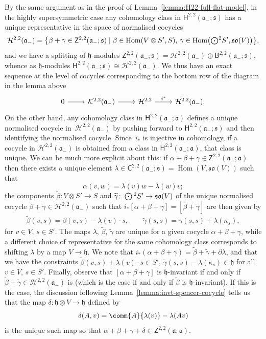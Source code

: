 \documentclass[10pt,a4paper]{amsart}
\numberwithin{equation}{section}
\newcommand{\fa}{\mathfrak{a}}
\newcommand{\fh}{\mathfrak{h}}
\newcommand{\fs}{\mathfrak{s}}
\newcommand{\fso}{\mathfrak{so}}
\newcommand{\cH}{\mathcal{H}}
\newcommand{\cK}{\mathcal{K}}
\newcommand{\ssB}{\mathsf{B}}
\newcommand{\ssC}{\mathsf{C}}
\newcommand{\ssH}{\mathsf{H}}
\newcommand{\ssZ}{\mathsf{Z}}
\newcommand{\betatilde}{\widetilde{\beta}}
\newcommand{\gammatilde}{\widetilde{\gamma}}
\newcommand{\Odot}{\mathchoice{{\textstyle\bigodot}}{\bigodot}{\bigodot}{\bigodot}}
\newcommand{\1}{\mathbbm{1}}
\DeclareMathOperator{\Hom}{Hom}
\begin{document}
By the same argument as in the proof of Lemma~\ref{lemma:H22-full-flat-model}, in the highly supersymmetric case any cohomology class in $\ssH^{2,2}(\fa_-;\fs)$ has a unique representative in the space of normalised cocycles
\[%
	\cH^{2,2}(\fa_-)
	= \bigl\{\beta+\gamma \in \ssZ^{2,2}(\fa_-;\fs)
		\mid
			\beta\in\Hom(V\otimes S',S),\,
			\gamma\in\Hom\bigl(\Odot^2S',\fso(V)\bigr)\bigr\},
\]
and we have a splitting of $\fh$-modules $\ssZ^{2,2}(\fa_-;\fs)=\cH^{2,2}(\fa_-)\oplus\ssB^{2,2}(\fa_-;\fs)$, whence as $\fh$-modules $\ssH^{2,2}(\fa_-;\fs) \cong \cH^{2,2}(\fa_-)$. We thus have an exact sequence at the level of cocycles corresponding to the bottom row of the diagram in the lemma above
\[
\begin{tikzcd}
	0 \arrow[r]
	& \cK^{2,2}(\fa_-) \arrow[r]
	& \cH^{2,2} \arrow[r, "i^*"]
	& \cH^{2,2}(\fa_-).
\end{tikzcd}
\]
On the other hand, any cohomology class in $\ssH^{2,2}(\fa_-;\fa)$ defines a unique normalised cocycle in~$\cH^{2,2}(\fa_-)$ by pushing forward to $\ssH^{2,2}(\fa_-;\fs)$ and then identifying the normalised cocycle. Since~$i_*$ is injective in cohomology, if a cocycle in $\cH^{2,2}(\fa_-)$ is obtained from a class in $\ssH^{2,2}(\fa_-;\fa)$, that class is unique. We can be much more explicit about this: if $\alpha+\beta+\gamma\in\ssZ^{2,2}(\fa_-;\fa)$ then there exists a unique element $\lambda\in\ssC^{2,2}(\fa_-;\fs)=\Hom(V,\fso(V))$ such that
\begin{equation}\label{eq:alpha-lambda}
	\alpha(v,w) = \lambda(v)w - \lambda(w)v;
\end{equation}
the components $\betatilde\colon V\otimes S' \to S$ and $\gammatilde\colon \Odot^2 S' \to \fso(V)$ of the unique normalised cocycle $\betatilde+\gammatilde\in\cH^{2,2}(\fa_-)$ such that $i_*[\alpha+\beta+\gamma]=[\betatilde+\gammatilde]$ are then given by
\begin{align}%
	\betatilde(v,s) = \beta(v,s) - \lambda(v)\cdot s,\qquad
	\gammatilde(s,s) = \gamma(s,s) + \lambda(\kappa_s), \label{eq:gamma-tilde}
\end{align}
for $v\in V$, $s\in S'$. The maps $\lambda$, $\betatilde$, $\gammatilde$ are unique for a given cocycle $\alpha+\beta+\gamma$, while a different choice of representative for the same cohomology class corresponds to shifting $\lambda$ by a map $V\to\fh$. We note that
$i_*(\alpha+\beta+\gamma) = \betatilde+\gammatilde+\partial\lambda$,
and that we have the constraints
$\betatilde(v,s) + \lambda(v)\cdot s \in S'$, $
	\gammatilde(s,s) - \lambda(\kappa_s) \in \fh$
for all $v\in V$, $s\in S'$. Finally, observe that $[\alpha+\beta+\gamma]$ is $\fh$-invariant if and only if $\betatilde+\gammatilde\in\cH^{2,2}(\fa_-)$ is (which is the case if and only if $\betatilde$ is $\fh$-invariant). If this is the case, the discussion following Lemma~\ref{lemma:invt-spencer-cocycle} tells us that the map $\delta\colon \fh\otimes V\to\fh$ defined by
\begin{equation}\label{eq:delta-lambda}
	\delta(A,v) = \comm{A}{\lambda(v)} - \lambda(Av)
\end{equation}
is the unique such map so that $\alpha+\beta+\gamma+\delta\in\ssZ^{2,2}(\fa;\fa)$.
\end{document}
